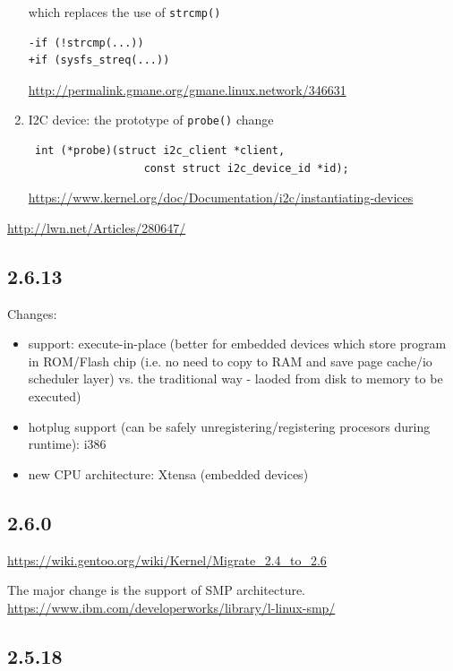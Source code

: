 \begin{enumerate}
which replaces the use of \verb!strcmp()!
\begin{verbatim}
-if (!strcmp(...))
+if (sysfs_streq(...))
\end{verbatim}
\url{http://permalink.gmane.org/gmane.linux.network/346631}


  \item I2C device: the prototype of \verb!probe()! change

\begin{verbatim}
 int (*probe)(struct i2c_client *client, 
                  const struct i2c_device_id *id);
\end{verbatim}
\url{https://www.kernel.org/doc/Documentation/i2c/instantiating-devices}

\end{enumerate}

\url{http://lwn.net/Articles/280647/}



\subsection{2.6.13}

Changes:
\begin{itemize}
  
  \item support: execute-in-place (better for embedded devices which store
  program in ROM/Flash chip (i.e. no need to copy to RAM and save page cache/io
  scheduler layer) vs. the traditional way - laoded from disk to memory to be
  executed)
  
  \item hotplug support (can be safely unregistering/registering procesors
  during runtime): i386
  
  \item new CPU architecture: Xtensa (embedded devices) 
  
\end{itemize}

\subsection{2.6.0}
\label{sec:kernel-change-2.4-to-2.6}

\url{https://wiki.gentoo.org/wiki/Kernel/Migrate_2.4_to_2.6}

The major change is the support of SMP architecture.
\url{https://www.ibm.com/developerworks/library/l-linux-smp/}


\subsection{2.5.18}

